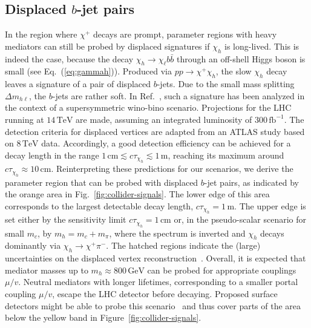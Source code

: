 \documentclass[nofootinbib,prd,aps,superscriptaddress,preprintnumbers]{revtex4}
\begin{document}
\subsection{Displaced $b$-jet pairs}\noindent In the region where $\chi^+$ decays are prompt, parameter regions with heavy mediators can still be probed by displaced signatures if $\chi_h$ is long-lived. This is indeed the case, because the decay $\chi_h \rightarrow \chi_\ell b \bar{b}$ through an off-shell Higgs boson is small (see Eq.~(\ref{eq:gammah})). Produced via $pp\to \chi^+\chi_h$, the slow $\chi_h$ decay leaves a signature of a pair of displaced $b$-jets. Due to the small mass splitting $\Delta m_{h\ell}$, the $b$-jets are rather soft. In Ref.~\cite{Nagata:2015pra}, such a signature has been analyzed in the context of a supersymmetric wino-bino scenario. Projections for the LHC running at $14\,\text{TeV}$ are made, assuming an integrated luminosity of $300\,\text{fb}^{-1}$. The detection criteria for displaced vertices are adapted from an ATLAS study based on $8\,\text{TeV}$ data. Accordingly, a good detection efficiency can be achieved for a decay length in the range $1\,\text{cm} \lesssim c \tau_{\chi_{h}} \lesssim 1\,\text{m}$, reaching its maximum around $c \tau_{\chi_{h}} \approx 10\,\text{cm}$. Reinterpreting these predictions for our scenarios, we derive the parameter region that can be probed with displaced $b$-jet pairs, as indicated by the orange area in Fig.~\ref{fig:collider-signals}. The lower edge of this area corresponds to the largest detectable decay length, $c \tau_{\chi_{h}}= 1\,\text{m}$. The upper edge is set either by the sensitivity limit $c \tau_{\chi_{h}} = 1\,\text{cm}$ or, in the pseudo-scalar scenario for small $m_c$, by $m_h = m_c + m_\pi$, where the spectrum is inverted and $\chi_h$ decays dominantly via $\chi_h \to \chi^+\pi^-$. The hatched regions indicate the (large) uncertainties on the displaced vertex reconstruction~\cite{Nagata:2015pra}. Overall, it is expected that mediator masses up to $m_h \approx 800\,\text{GeV}$ can be probed for appropriate couplings $\mu/v$. Neutral mediators with longer lifetimes, corresponding to a smaller portal coupling $\mu/v$, escape the LHC detector before decaying. Proposed surface detectors might be able to probe this scenario~\cite{Curtin:2018mvb} and thus cover parts of the area below the yellow band in Figure~\ref{fig:collider-signals}.
\end{document}
